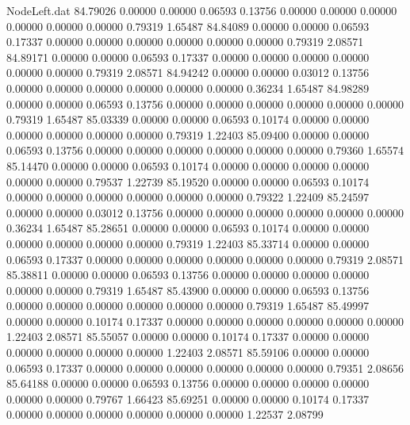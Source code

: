 \begin{filecontents}{NodeLeft.dat}
  84.79026    0.00000    0.00000     0.06593    0.13756    0.00000    0.00000    0.00000    0.00000    0.00000    0.00000    0.79319    1.65487
  84.84089    0.00000    0.00000     0.06593    0.17337    0.00000    0.00000    0.00000    0.00000    0.00000    0.00000    0.79319    2.08571
  84.89171    0.00000    0.00000     0.06593    0.17337    0.00000    0.00000    0.00000    0.00000    0.00000    0.00000    0.79319    2.08571
  84.94242    0.00000    0.00000     0.03012    0.13756    0.00000    0.00000    0.00000    0.00000    0.00000    0.00000    0.36234    1.65487
  84.98289    0.00000    0.00000     0.06593    0.13756    0.00000    0.00000    0.00000    0.00000    0.00000    0.00000    0.79319    1.65487
  85.03339    0.00000    0.00000     0.06593    0.10174    0.00000    0.00000    0.00000    0.00000    0.00000    0.00000    0.79319    1.22403
  85.09400    0.00000    0.00000     0.06593    0.13756    0.00000    0.00000    0.00000    0.00000    0.00000    0.00000    0.79360    1.65574
  85.14470    0.00000    0.00000     0.06593    0.10174    0.00000    0.00000    0.00000    0.00000    0.00000    0.00000    0.79537    1.22739
  85.19520    0.00000    0.00000     0.06593    0.10174    0.00000    0.00000    0.00000    0.00000    0.00000    0.00000    0.79322    1.22409
  85.24597    0.00000    0.00000     0.03012    0.13756    0.00000    0.00000    0.00000    0.00000    0.00000    0.00000    0.36234    1.65487
  85.28651    0.00000    0.00000     0.06593    0.10174    0.00000    0.00000    0.00000    0.00000    0.00000    0.00000    0.79319    1.22403
  85.33714    0.00000    0.00000     0.06593    0.17337    0.00000    0.00000    0.00000    0.00000    0.00000    0.00000    0.79319    2.08571
  85.38811    0.00000    0.00000     0.06593    0.13756    0.00000    0.00000    0.00000    0.00000    0.00000    0.00000    0.79319    1.65487
  85.43900    0.00000    0.00000     0.06593    0.13756    0.00000    0.00000    0.00000    0.00000    0.00000    0.00000    0.79319    1.65487
  85.49997    0.00000    0.00000     0.10174    0.17337    0.00000    0.00000    0.00000    0.00000    0.00000    0.00000    1.22403    2.08571
  85.55057    0.00000    0.00000     0.10174    0.17337    0.00000    0.00000    0.00000    0.00000    0.00000    0.00000    1.22403    2.08571
  85.59106    0.00000    0.00000     0.06593    0.17337    0.00000    0.00000    0.00000    0.00000    0.00000    0.00000    0.79351    2.08656
  85.64188    0.00000    0.00000     0.06593    0.13756    0.00000    0.00000    0.00000    0.00000    0.00000    0.00000    0.79767    1.66423
  85.69251    0.00000    0.00000     0.10174    0.17337    0.00000    0.00000    0.00000    0.00000    0.00000    0.00000    1.22537    2.08799

\end{filecontents}
